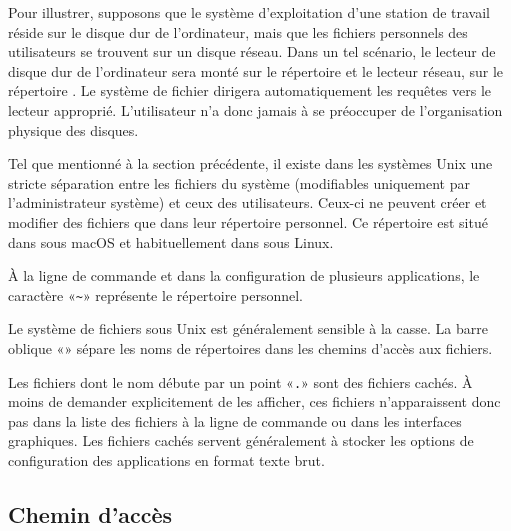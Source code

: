 Pour illustrer, supposons que le système d'exploitation d'une station
de travail réside sur le disque dur de l'ordinateur, mais que les
fichiers personnels des utilisateurs se trouvent sur un disque réseau.
Dans un tel scénario, le lecteur de disque dur de l'ordinateur sera
monté sur le répertoire \code{/} et le lecteur réseau, sur le
répertoire . Le système de fichier dirigera
automatiquement les requêtes vers le lecteur approprié. L'utilisateur
n'a donc jamais à se préoccuper de l'organisation physique des
disques.

Tel que mentionné à la section précédente, il existe dans les systèmes
Unix une stricte séparation entre les fichiers du système
(modifiables uniquement par l'administrateur système) et ceux des
utilisateurs. Ceux-ci ne peuvent créer et modifier des fichiers que
dans leur %
répertoire personnel.
Ce répertoire est situé dans  sous macOS et
habituellement dans  sous Linux.

À la ligne de commande et dans la configuration de plusieurs
applications, le caractère %
«\verb=~=» %
représente le répertoire personnel.

Le système de fichiers sous Unix est généralement sensible
à la casse. La barre oblique «\code{/}» sépare les noms de répertoires
dans les chemins d'accès aux fichiers.

Les fichiers dont le nom débute par un point «\verb=.=» sont des
fichiers cachés. À moins de demander explicitement de les afficher,
ces fichiers n'apparaissent donc pas dans la liste des fichiers à la
ligne de commande ou dans les interfaces graphiques. Les fichiers
cachés servent généralement à stocker les options de configuration des
applications en format texte brut.



\subsection{Chemin d'accès}
\label{sec:informatique:fs:path}

